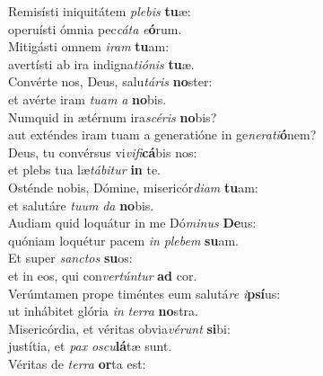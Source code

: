 \evenverse Remisísti iniquitátem \textit{ple}\textit{bis} \textbf{tu}æ:~\*\\
\evenverse operuísti ómnia pec\textit{cá}\textit{ta} \textit{e}\textbf{ó}rum.\\
\oddverse Mitigásti omnem \textit{i}\textit{ram} \textbf{tu}am:~\*\\
\oddverse avertísti ab ira indigna\textit{ti}\textit{ó}\textit{nis} \textbf{tu}æ.\\
\evenverse Convérte nos, Deus, salu\textit{tá}\textit{ris} \textbf{no}ster:~\*\\
\evenverse et avérte iram \textit{tu}\textit{am} \textit{a} \textbf{no}bis.\\
\oddverse Numquid in ætérnum ira\textit{scé}\textit{ris} \textbf{no}bis?~\*\\
\oddverse aut exténdes iram tuam a generatióne in ge\textit{ne}\textit{ra}\textit{ti}\textbf{ó}nem?\\
\evenverse Deus, tu convérsus vi\textit{vi}\textit{fi}\textbf{cá}bis nos:~\*\\
\evenverse et plebs tua læ\textit{tá}\textit{bi}\textit{tur} \textbf{in} te.\\
\oddverse Osténde nobis, Dómine, misericór\textit{di}\textit{am} \textbf{tu}am:~\*\\
\oddverse et salutáre \textit{tu}\textit{um} \textit{da} \textbf{no}bis.\\
\evenverse Audiam quid loquátur in me Dó\textit{mi}\textit{nus} \textbf{De}us:~\*\\
\evenverse quóniam loquétur pacem \textit{in} \textit{ple}\textit{bem} \textbf{su}am.\\
\oddverse Et super \textit{san}\textit{ctos} \textbf{su}os:~\*\\
\oddverse et in eos, qui con\textit{ver}\textit{tún}\textit{tur} \textbf{ad} cor.\\
\evenverse Verúmtamen prope timéntes eum salutá\textit{re} \textit{i}\textbf{psí}us:~\*\\
\evenverse ut inhábitet glória \textit{in} \textit{ter}\textit{ra} \textbf{no}stra.\\
\oddverse Misericórdia, et véritas obvia\textit{vé}\textit{runt} \textbf{si}bi:~\*\\
\oddverse justítia, et \textit{pax} \textit{o}\textit{scu}\textbf{lá}tæ sunt.\\
\evenverse Véritas de \textit{ter}\textit{ra} \textbf{or}ta est:~\*\\
